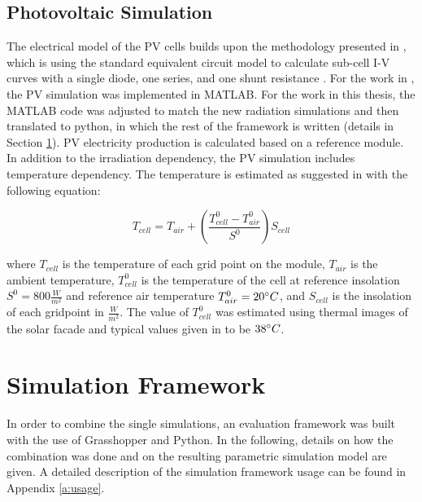 		\subsection{Photovoltaic Simulation}
			The electrical model of the PV cells builds upon the methodology presented in \cite{hofer2016}, which is using the standard equivalent circuit model to calculate sub-cell I-V curves with a single diode, one series, and one shunt resistance \cite{mermoud2010}. For the work in \cite{hofer2016}, the PV simulation was implemented in MATLAB. For the work in this thesis, the MATLAB code was adjusted to match the new radiation simulations and then translated to python, in which the rest of the framework is written (details in Section \ref{s:simulationFramework}). PV electricity production is calculated based on a reference module. In addition to the irradiation dependency, the PV simulation includes temperature dependency. The temperature is estimated as suggested in \cite{Ross_Smokler_1986} with the following equation:

			\begin{equation}
				T_{cell} = T_{air} + \left(\frac{T_{cell}^0-T_{air}^0}{S^0}\right)S_{cell}
	      		\label{e:temp}
			\end{equation}

			where $T_{cell}$ is the temperature of each grid point on the module, $T_{air}$ is the ambient temperature, $T_{cell}^0$ is the temperature of the cell at reference insolation $S^0=800\frac{W}{m^2}$ and reference air temperature $T_{air}^0=20\degree C$, and $S_{cell}$ is the insolation of each gridpoint in $\frac{W}{m^2}$. The value of $T_{cell}^0$ was estimated using thermal images of the solar facade and typical values given in \cite{Ross_Smokler_1986} to be $38\degree C$. 



	\section{Simulation Framework}
	\label{s:simulationFramework}
		In order to combine the single simulations, an evaluation framework was built with the use of Grasshopper and Python. In the following, details on how the combination was done and on the resulting parametric simulation model are given. A detailed description of the simulation framework usage can be found in Appendix \ref{a:usage}. 

